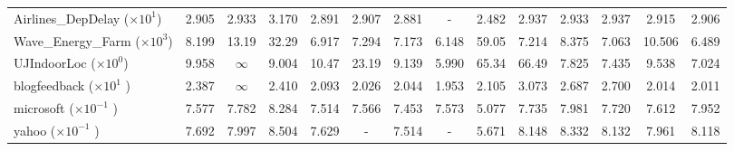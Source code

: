 \begin{table}[h]
{\begin{tabular}{lccccccccccccc}
Airlines\_DepDelay ($\times 10^1$) & 2.905 & 2.933 & 3.170 & 2.891 & 2.907 & 2.881 & - & 2.482 & 2.937 & 2.933 & 2.937 & 2.915 &2.906 \\
Wave\_Energy\_Farm ($\times 10^3$) & 8.199 & 13.19 & 32.29 & 6.917 & 7.294 & 7.173 & 6.148 & 59.05 & 7.214 & 8.375 & 7.063 & 10.506 &6.489\\
UJIndoorLoc ($\times 10^0$)  & 9.958 & $\infty$ & 9.004 & 10.47 & 23.19 & 9.139 & 5.990 & 65.34 & 66.49 & 7.825 & 7.435 & 9.538 &7.024\\
blogfeedback ($\times 10^1$ ) & 2.387 & $\infty$ & 2.410 & 2.093 & 2.026 & 2.044 & 1.953 & 2.105 & 3.073 & 2.687 & 2.700 & 2.014 &2.011\\
microsoft ($\times 10^{-1}$ ) & 7.577 & 7.782 & 8.284 & 7.514 & 7.566 & 7.453 & 7.573 & 5.077 & 7.735 & 7.981 & 7.720 & 7.612 &7.952\\
yahoo ($\times 10^{-1}$ ) &7.692 & 7.997 & 8.504 & 7.629 & - & 7.514 & - & 5.671 & 8.148 & 8.332 & 8.132 & 7.961 &8.118\\
\bottomrule
\end{tabular}
}
\end{table}

